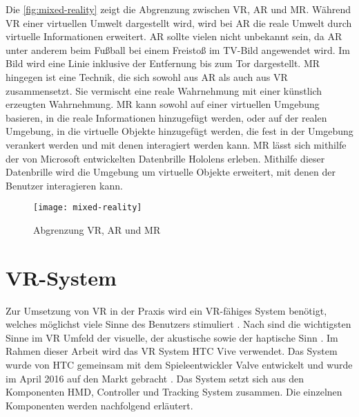 Die \autoref{fig:mixed-reality} zeigt die Abgrenzung zwischen \ac{VR}, \ac{AR} und \ac{MR}. Während \ac{VR} einer virtuellen Umwelt dargestellt wird, wird bei \ac{AR} die reale Umwelt durch virtuelle Informationen erweitert. \ac{AR} sollte vielen  nicht unbekannt sein, da \ac{AR} unter anderem beim Fußball bei einem Freistoß im TV-Bild angewendet wird. Im Bild wird eine Linie inklusive der Entfernung bis zum Tor dargestellt. \ac{MR} hingegen ist eine Technik, die sich sowohl aus \ac{AR} als auch aus \ac{VR} zusammensetzt. Sie vermischt eine reale Wahrnehmung mit einer künstlich erzeugten Wahrnehmung. \ac{MR} kann sowohl auf einer virtuellen Umgebung basieren, in die reale Informationen hinzugefügt werden, oder auf der realen Umgebung, in die virtuelle Objekte hinzugefügt werden, die fest in der Umgebung verankert werden und mit denen interagiert werden kann. \ac{MR} lässt sich mithilfe der von Microsoft entwickelten Datenbrille Hololens erleben. Mithilfe dieser Datenbrille wird die Umgebung um virtuelle Objekte erweitert, mit denen der Benutzer interagieren kann.
\begin{figure}[!htbp]
	\centering
	\texttt{[image: mixed-reality]}
	\caption[Abgrenzung VR, AR und MR]{Abgrenzung VR, AR und MR \cite[S. 20]{BurofurTechnikfolgenAbschatzungbeimDeutschenBundestag.2019}}
	\label{fig:mixed-reality}
\end{figure}

\section{\acs{VR}-System}
Zur Umsetzung von \ac{VR} in der Praxis wird ein \ac{VR}-fähiges System benötigt, welches möglichst viele Sinne des Benutzers stimuliert \cite{Doerner2019}. Nach \citeauthor{DoernerWahrnehmung} sind die wichtigsten Sinne im \ac{VR} Umfeld der visuelle, der akustische sowie der haptische Sinn \cite{DoernerWahrnehmung}. Im Rahmen dieser Arbeit wird das \acs{VR} System HTC Vive verwendet. Das System wurde von HTC gemeinsam mit dem Spieleentwickler Valve entwickelt und wurde im April 2016 auf den Markt gebracht \cite{Fehrenbach.14.4.2016}. Das System setzt sich aus den Komponenten \ac{HMD}, Controller und Tracking System zusammen. Die einzelnen Komponenten werden nachfolgend erläutert. 

